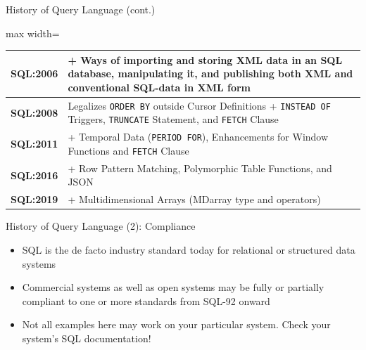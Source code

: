 \documentclass[aspectratio=169, xcolor=dvipsnames]{beamer}
\begin{document}
\begin{frame}{History of Query Language (cont.)}
    \begin{center}
        \begin{adjustbox}{max width=\textwidth}
        \begin{tabular}{|l|p{12cm}|}
        \hline
        \textbf{SQL:2006} & + Ways of importing and storing XML data in an SQL database, manipulating it, and publishing both XML and conventional SQL-data in XML form \\ \hline
        \textbf{SQL:2008} & Legalizes \texttt{ORDER BY} outside Cursor Definitions + \texttt{INSTEAD OF} Triggers, \texttt{TRUNCATE} Statement, and \texttt{FETCH} Clause \\ \hline
        \textbf{SQL:2011} & + Temporal Data (\texttt{PERIOD FOR}), Enhancements for Window Functions and \texttt{FETCH} Clause \\ \hline
        \textbf{SQL:2016} & + Row Pattern Matching, Polymorphic Table Functions, and JSON \\ \hline
        \textbf{SQL:2019} & + Multidimensional Arrays (MDarray type and operators) \\ \hline
        \end{tabular}
        \end{adjustbox}
    \end{center}
\end{frame}

\begin{frame}{History of Query Language (2): Compliance}
    \begin{itemize}[<+->]
        \item SQL is the de facto industry standard today for relational or structured data systems
        \item Commercial systems as well as open systems may be fully or partially compliant to one or more standards from SQL-92 onward
        \item Not all examples here may work on your particular system. Check your system's SQL documentation!
    \end{itemize}
\end{frame}
\end{document}
